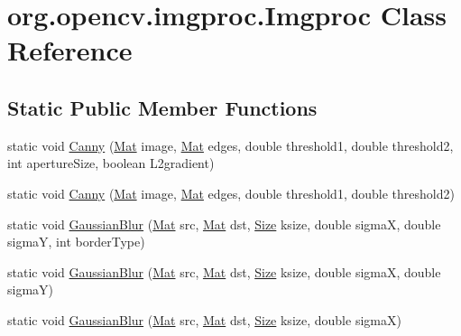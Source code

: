 \hypertarget{classorg_1_1opencv_1_1imgproc_1_1_imgproc}{}\section{org.\+opencv.\+imgproc.\+Imgproc Class Reference}
\label{classorg_1_1opencv_1_1imgproc_1_1_imgproc}
\subsection*{Static Public Member Functions}
\begin{DoxyCompactItemize}
\item 
static void \mbox{\hyperlink{classorg_1_1opencv_1_1imgproc_1_1_imgproc_ac6e36285c582511bc5afe41d9d0b0e41}{Canny}} (\mbox{\hyperlink{classorg_1_1opencv_1_1core_1_1_mat}{Mat}} image, \mbox{\hyperlink{classorg_1_1opencv_1_1core_1_1_mat}{Mat}} edges, double threshold1, double threshold2, int aperture\+Size, boolean L2gradient)
\item 
static void \mbox{\hyperlink{classorg_1_1opencv_1_1imgproc_1_1_imgproc_ae979d995b2b91944a5db1e3be9c3835f}{Canny}} (\mbox{\hyperlink{classorg_1_1opencv_1_1core_1_1_mat}{Mat}} image, \mbox{\hyperlink{classorg_1_1opencv_1_1core_1_1_mat}{Mat}} edges, double threshold1, double threshold2)
\item 
static void \mbox{\hyperlink{classorg_1_1opencv_1_1imgproc_1_1_imgproc_a1f720ad6bef4616a3268c98abd811350}{Gaussian\+Blur}} (\mbox{\hyperlink{classorg_1_1opencv_1_1core_1_1_mat}{Mat}} src, \mbox{\hyperlink{classorg_1_1opencv_1_1core_1_1_mat}{Mat}} dst, \mbox{\hyperlink{classorg_1_1opencv_1_1core_1_1_size}{Size}} ksize, double sigmaX, double sigmaY, int border\+Type)
\item 
static void \mbox{\hyperlink{classorg_1_1opencv_1_1imgproc_1_1_imgproc_a6550b1518d3df5dc446f27cd8f1c2285}{Gaussian\+Blur}} (\mbox{\hyperlink{classorg_1_1opencv_1_1core_1_1_mat}{Mat}} src, \mbox{\hyperlink{classorg_1_1opencv_1_1core_1_1_mat}{Mat}} dst, \mbox{\hyperlink{classorg_1_1opencv_1_1core_1_1_size}{Size}} ksize, double sigmaX, double sigmaY)
\item 
static void \mbox{\hyperlink{classorg_1_1opencv_1_1imgproc_1_1_imgproc_a38b4cc1a250ce929d1b2635675332b6a}{Gaussian\+Blur}} (\mbox{\hyperlink{classorg_1_1opencv_1_1core_1_1_mat}{Mat}} src, \mbox{\hyperlink{classorg_1_1opencv_1_1core_1_1_mat}{Mat}} dst, \mbox{\hyperlink{classorg_1_1opencv_1_1core_1_1_size}{Size}} ksize, double sigmaX)
\item 

\end{DoxyCompactItemize}
